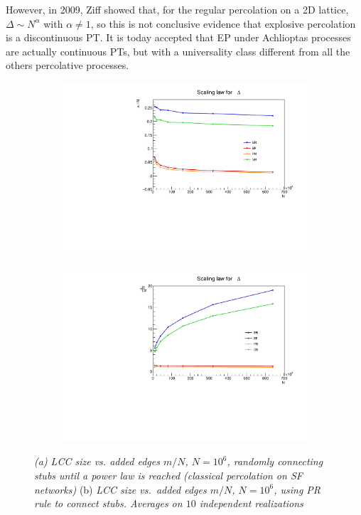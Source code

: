 However, in 2009, Ziff \cite{Ziff} showed that, for the regular percolation on a 2D lattice, $\Delta \sim N^{\alpha}$ with $\alpha \neq 1$, so this is not conclusive evidence that explosive percolation is a discontinuous PT.
It is today accepted that EP under Achlioptas processes are actually continuous PTs, but with a universality class
different from all the others percolative processes.
\begin{figure}
	\centering
	\begin{subfigure}[t]{0.48\linewidth}
		\includegraphics[width=\linewidth]{images/ScalingLaw.pdf}
		\vspace{-28pt}
		
		\caption{}
		\label{fig::ScalingDelta}
	\end{subfigure}
	\hspace{3pt}
	\begin{subfigure}[t]{0.48\linewidth}
		\includegraphics[width=\linewidth]{images/ScalingLaw23.pdf}
		\vspace{-28pt}
		\caption{} 
		\label{fig::ScalingDelta23}
	\end{subfigure}
	\vspace{-10pt}
	\caption{\textit{(a) LCC size vs. added edges $m/N$, $N = 10^6$, randomly connecting stubs until a power law is reached (classical percolation on SF networks)} (b) \textit{LCC size vs.\ added edges $m/N$, $N = 10^6$, using PR rule to connect stubs. Averages on $10$ independent realizations}}
\end{figure}

